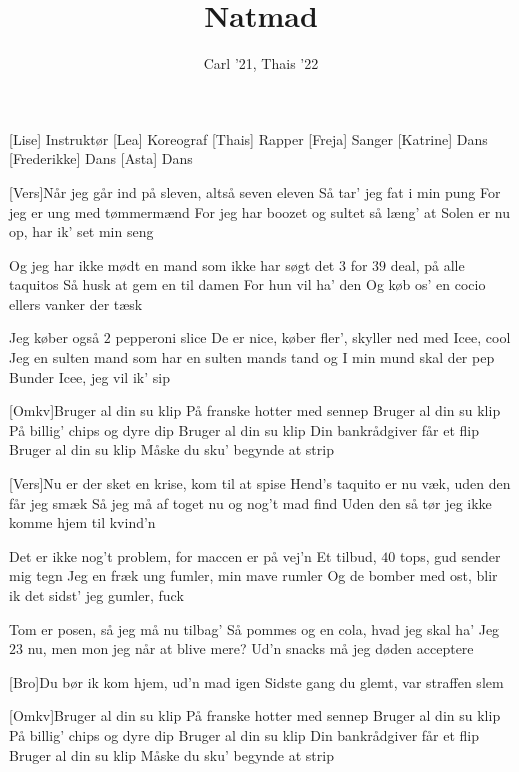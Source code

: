 \documentclass[a4paper,11pt]{article}
\title{Natmad}
\author{Carl '21, Thais '22}
\begin{document}
\maketitle

\begin{roles}
[Lise] Instruktør
[Lea] Koreograf
[Thais] Rapper
[Freja] Sanger
[Katrine] Dans
[Frederikke] Dans
[Asta] Dans
\end{roles}

\begin{song}

[Vers]Når jeg går ind på sleven, altså seven eleven
Så tar' jeg fat i min pung
For jeg er ung med tømmermænd 
For jeg har boozet og sultet så læng' at
Solen er nu op, har ik' set min seng

Og jeg har ikke mødt en mand som ikke har søgt det
$3$ for $39$ deal, på alle taquitos
Så husk at gem en til damen
For hun vil ha' den
Og køb os' en cocio ellers vanker der tæsk 

Jeg køber også $2$ pepperoni slice
De er nice, køber fler', skyller ned med Icee, cool
Jeg en sulten mand som har en sulten mands tand og
I min mund skal der pep
Bunder Icee, jeg vil ik' sip

[Omkv]Bruger al din su klip
På franske hotter med sennep 
Bruger al din su klip
På billig' chips og dyre dip
Bruger al din su klip
Din bankrådgiver får et flip
Bruger al din su klip
Måske du sku' begynde at strip 

[Vers]Nu er der sket en krise, kom til at spise 
Hend's taquito er nu væk, uden den får jeg smæk
Så jeg må af toget nu og nog't mad find
Uden den så tør jeg ikke komme hjem til kvind'n 

Det er ikke nog't problem, for maccen er på vej'n
Et tilbud, $40$ tops, gud sender mig tegn
Jeg en fræk ung fumler, min mave rumler
Og de bomber med ost, blir ik det sidst' jeg gumler, fuck

Tom er posen, så jeg må nu tilbag'
Så pommes og en cola, hvad jeg skal ha' 
Jeg $23$ nu, men mon jeg når at blive mere?
Ud'n snacks må jeg døden acceptere

[Bro]Du bør ik kom hjem, ud'n mad igen
Sidste gang du glemt, var straffen slem

[Omkv]Bruger al din su klip
På franske hotter med sennep 
Bruger al din su klip
På billig' chips og dyre dip
Bruger al din su klip
Din bankrådgiver får et flip
Bruger al din su klip
Måske du sku' begynde at strip 


\end{song}
\end{document}
